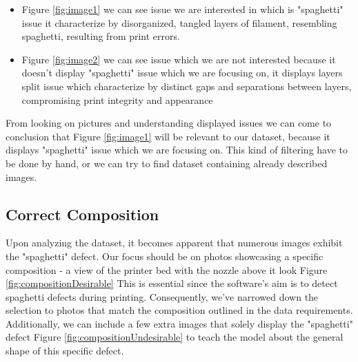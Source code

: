 \documentclass[12pt,a4paper]{article}
\begin{document}
\begin{itemize}
    \item Figure \ref{fig:image1} we can see issue we are interested in which is "spaghetti" issue it characterize by disorganized, tangled layers of filament, resembling spaghetti, resulting from print errors. 
    \item Figure \ref{fig:image2} we can see issue which we are not interested because it doesn't display "spaghetti" issue which we are focusing on, it displays layers split issue which characterize by distinct gaps and separations between layers, compromising print integrity and appearance
\end{itemize}

From looking on pictures and understanding displayed issues we can come to conclusion that Figure \ref{fig:image1} will be relevant to our dataset, because it displays "spaghetti" issue which we are focusing on. This kind of filtering have to be done by hand, or we can try to find dataset containing already described images.

\subsection{Correct Composition}
Upon analyzing the dataset, it becomes apparent that numerous images exhibit the "spaghetti" defect. Our focus should be on photos showcasing a specific composition - a view of the printer bed with the nozzle above it look Figure \ref{fig:compositionDesirable} This is essential since the software's aim is to detect spaghetti defects during printing. Consequently, we've narrowed down the selection to photos that match the composition outlined in the data requirements. Additionally, we can include a few extra images that solely display the "spaghetti" defect Figure \ref{fig:compositionUndesirable} to teach the model about the general shape of this specific defect.
\end{document}
